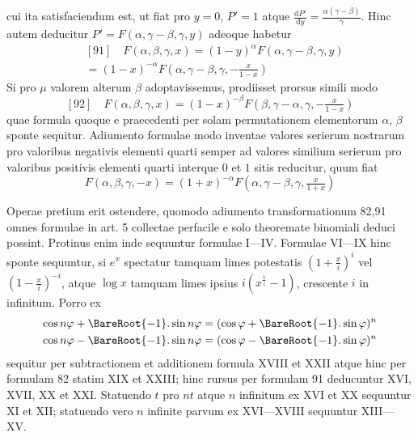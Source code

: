 cui ita satisfaciendum est, ut fiat pro $y=0$, $P'=1$ atque
$\frac{\mathrm{d}P'}{\mathrm{d}y}=\frac{\alpha(\gamma-\beta)}{\gamma}$. Hinc
autem deducitur $P'=F(\alpha,\gamma-\beta,\gamma,y)$ adeoque habetur
\[
\begin{aligned}&[91]\quad F(\alpha,\beta,\gamma,x)=(1-y)^\alpha F(\alpha,\gamma-\beta,\gamma,y)\\&=(1-x)^{-\alpha}F(\alpha,\gamma-\beta,\gamma,-\tfrac{x}{1-x})\end{aligned}
\]
Si pro $\mu$ valorem alterum $\beta$ adoptavissemus, prodiisset prorsus simili modo
\[
[92]\quad F(\alpha,\beta,\gamma,x)=(1-x)^{-\beta}F(\beta,\gamma-\alpha,\gamma,-\tfrac{x}{1-x})
\]
quae formula quoque e praecedenti per solam permutationem elementorum $\alpha$, $\beta$
sponte sequitur. Adiumento formulae modo inventae valores serierum nostrarum
pro valoribus negativis elementi quarti semper ad valores similium serierum pro
valoribus positivis elementi quarti interque $0$ et $1$ sitis reducitur, quum fiat
\[
F(\alpha,\beta,\gamma,-x)=(1+x)^{-\alpha}F(\alpha,\gamma-\beta,\gamma,\tfrac{x}{1+x})
\]

Operae pretium erit ostendere, quomodo adiumento transformationum
82,91 omnes formulae in art. 5 collectae perfacile e solo theoremate binomiali
deduci possint. Protinus enim inde sequuntur formulae I---IV. Formulae VI---IX hinc sponte sequuntur, si \(e^x\) spectatur tamquam limes potestatis
\(\left(1+\frac{x}{i}\right)^i\) vel \(\left(1-\frac{x}{i}\right)^{-i}\), atque \(\log x\) tamquam limes ipsius \(i(x^{\frac{1}{i}}-1)\), crescente \(i\)
in infinitum. Porro ex
\[
\begin{aligned}[c]
\cos n\varphi+\BareRoot{-1}.\sin n\varphi&=(\cos\varphi+\BareRoot{-1}.\sin\varphi)^n\\
\cos n\varphi-\BareRoot{-1}.\sin n\varphi&=(\cos\varphi-\BareRoot{-1}.\sin\varphi)^n
\end{aligned}
\]
sequitur per subtractionem et additionem formula XVIII et XXII atque hinc
per formulam 82 statim XIX et XXIII; hinc rursus per formulam 91 deducuntur XVI, XVII, XX et XXI. Statuendo \(t\) pro \(nt\) atque \(n\) infinitum ex XVI et
XX sequuntur XI et XII; statuendo vero \(n\) infinite parvum ex XVI---XVIII
sequuntur XIII---XV.


